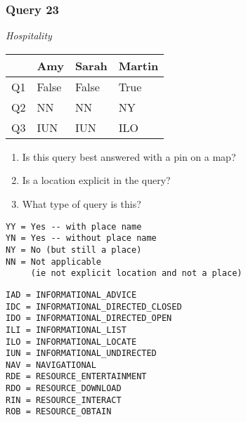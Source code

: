 \begin{frame}[fragile]
\frametitle{Query 23}
\vspace{1em}

\emph{Hospitality}

\vfill

\begin{table}
  \centering
  \begin{tabular}{ l l l l }
    & \textbf{Amy} & \textbf{Sarah} & \textbf{Martin}\\
    \toprule
    Q1 & False & False & True\\
Q2 & NN & NN & NY\\
Q3 & IUN & IUN & ILO\\
    \bottomrule
  \end{tabular}
\end{table}

\vfill

\tiny{

\begin{enumerate}
\item Is this query best answered with a pin on a map?
\item Is a location explicit in the query?
\item What type of query is this?
\end{enumerate}

\vfill

\begin{multicols}{2}
\begin{verbatim}
YY = Yes -- with place name
YN = Yes -- without place name
NY = No (but still a place)
NN = Not applicable 
     (ie not explicit location and not a place)
\end{verbatim}

\columnbreak
\begin{verbatim}
IAD = INFORMATIONAL_ADVICE
IDC = INFORMATIONAL_DIRECTED_CLOSED
IDO = INFORMATIONAL_DIRECTED_OPEN
ILI = INFORMATIONAL_LIST
ILO = INFORMATIONAL_LOCATE
IUN = INFORMATIONAL_UNDIRECTED
NAV = NAVIGATIONAL
RDE = RESOURCE_ENTERTAINMENT
RDO = RESOURCE_DOWNLOAD
RIN = RESOURCE_INTERACT
ROB = RESOURCE_OBTAIN
\end{verbatim}
\end{multicols}
}

\end{frame}


